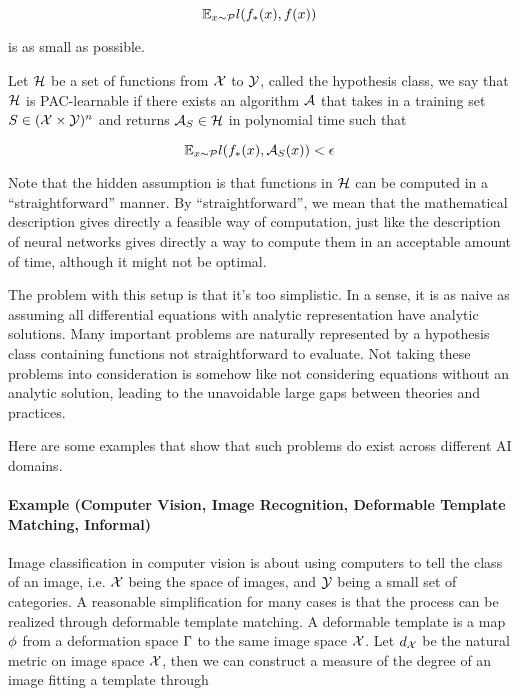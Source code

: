 \documentclass[11pt, oneside]{article}   	%
\theoremstyle{definition}
\begin{document}
\[ \mathbb{E}_{x \sim \mathcal{P}}l(f_*(x),f(x)) \]

is as small as possible.

Let $\mathcal{H}$ be a set of functions from $\mathcal{X}$ to $\mathcal{Y}$, called the hypothesis class, we say that $\mathcal{H}$ is PAC-learnable if there exists an algorithm $\mathcal{A}$ that takes in a training set $S \in (\mathcal{X} \times \mathcal{Y})^n$ and returns $\mathcal{A}_S \in \mathcal{H}$ in polynomial time such that

\[ \mathbb{E}_{x \sim \mathcal{P}}l(f_*(x), \mathcal{A}_S(x)) < \epsilon \]

Note that the hidden assumption is that functions in $\mathcal{H}$ can be computed in a ``straightforward'' manner. By ``straightforward'', we mean that the mathematical description gives directly a feasible way of computation, just like the description of neural networks gives directly a way to compute them in an acceptable amount of time, although it might not be optimal.

The problem with this setup is that it's too simplistic. In a sense, it is as naive as assuming all differential equations with analytic representation have analytic solutions.  Many important problems are naturally represented by a hypothesis class containing functions not straightforward to evaluate. Not taking these problems into consideration is somehow like not considering equations without an analytic solution, leading to the unavoidable large gaps between theories and practices.

Here are some examples that show that such problems do exist across different AI domains.

\paragraph{Example (Computer Vision, Image Recognition, Deformable Template Matching, Informal)} Image classification in computer vision is about using computers to tell the class of an image, i.e. $\mathcal{X}$ being the space of images, and $\mathcal{Y}$ being a small set of categories. A reasonable simplification for many cases is that the process can be realized through deformable template matching. A deformable template is a map $\phi$ from a deformation space $\Gamma$ to the same image space $\mathcal{X}$. Let $d_{\mathcal{X}}$ be the natural metric on image space $\mathcal{X}$, then we can construct a measure of the degree of an image fitting a template through
\end{document}

